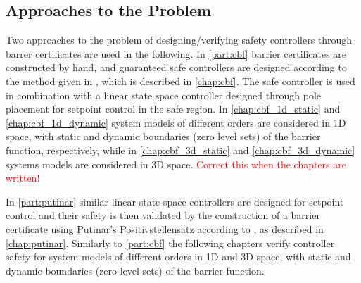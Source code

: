 \subsection{Approaches to the Problem}
Two approaches to the problem of designing/verifying safety controllers through barrer certificates are used in the following. In \autoref{part:cbf} barrier certificates are constructed by hand, and guaranteed safe controllers are designed according to the method given in \citep{bib:org_control}, which is described in \autoref{chap:cbf}. The safe controller is used in combination with a linear state space controller designed through pole placement for setpoint control in the safe region. In \autoref{chap:cbf_1d_static} and \ref{chap:cbf_1d_dynamic} system models of different orders are considered in 1D space, with static and dynamic boundaries (zero level sets) of the barrier function, respectively, while in \autoref{chap:cbf_3d_static} and \ref{chap:cbf_3d_dynamic} systems models are considered in 3D space. \textcolor{red}{Correct this when the chapters are written!}

In \autoref{part:putinar} similar linear state-space controllers are designed for setpoint control and their safety is then validated by the construction of a barrier certificate using Putinar's Positivstellensatz according to \citep{bib:sos_putinar_lasserre}, as described in \autoref{chap:putinar}. Similarly to \autoref{part:cbf} the following chapters verify controller safety for system models of different orders in 1D and 3D space, with static and dynamic boundaries (zero level sets) of the barrier function.










